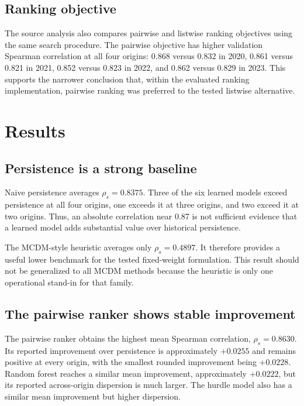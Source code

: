 \documentclass[conference]{IEEEtran}
\begin{document}
\subsection{Ranking objective}

The source analysis also compares pairwise and listwise ranking objectives using the same search procedure. The pairwise objective has higher validation Spearman correlation at all four origins: 0.868 versus 0.832 in 2020, 0.861 versus 0.821 in 2021, 0.852 versus 0.823 in 2022, and 0.862 versus 0.829 in 2023. This supports the narrower conclusion that, within the evaluated ranking implementation, pairwise ranking was preferred to the tested listwise alternative.

\section{Results}
\label{sec:results}

\subsection{Persistence is a strong baseline}

Naive persistence averages $\rho_s=0.8375$. Three of the six learned models exceed persistence at all four origins, one exceeds it at three origins, and two exceed it at two origins. Thus, an absolute correlation near 0.87 is not sufficient evidence that a learned model adds substantial value over historical persistence.

The MCDM-style heuristic averages only $\rho_s=0.4897$. It therefore provides a useful lower benchmark for the tested fixed-weight formulation. This result should not be generalized to all MCDM methods because the heuristic is only one operational stand-in for that family.

\subsection{The pairwise ranker shows stable improvement}

The pairwise ranker obtains the highest mean Spearman correlation, $\rho_s=0.8630$. Its reported improvement over persistence is approximately $+0.0255$ and remains positive at every origin, with the smallest rounded improvement being $+0.0228$. Random forest reaches a similar mean improvement, approximately $+0.0222$, but its reported across-origin dispersion is much larger. The hurdle model also has a similar mean improvement but higher dispersion.
\end{document}

